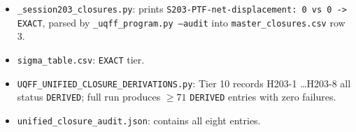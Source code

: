 \documentclass[11pt,letterpaper]{article}
\theoremstyle{plain}
\theoremstyle{definition}
\begin{document}
\begin{itemize}
   \item \texttt{\_session203\_closures.py}: prints
         \texttt{S203-PTF-net-displacement: 0 vs 0 -> EXACT}, parsed by
         \texttt{\_uqff\_program.py --audit} into
         \texttt{master\_closures.csv} row 3.
   \item \texttt{sigma\_table.csv}: \texttt{EXACT} tier.
   \item \texttt{UQFF\_UNIFIED\_CLOSURE\_DERIVATIONS.py}: Tier 10
         records H203-1 \ldots H203-8 all status \texttt{DERIVED}; full
         run produces $\ge 71$ \texttt{DERIVED} entries with zero
         failures.
   \item \texttt{unified\_closure\_audit.json}: contains all eight
         entries.
\end{itemize}
\end{document}
